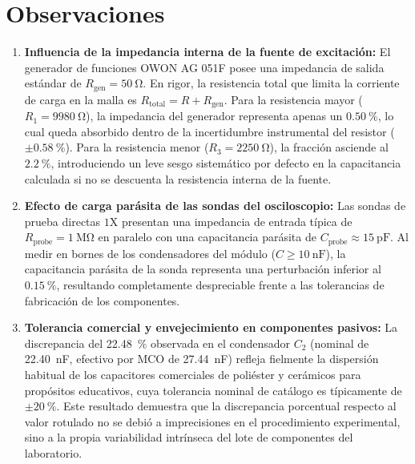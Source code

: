 
\section{Observaciones}
\label{sec:observaciones}

\begin{enumerate}
    \item \textbf{Influencia de la impedancia interna de la fuente de excitación:} El generador de funciones OWON AG 051F posee una impedancia de salida estándar de $R_{\text{gen}} = \qty{50}{\ohm}$. En rigor, la resistencia total que limita la corriente de carga en la malla es $R_{\text{total}} = R + R_{\text{gen}}$. Para la resistencia mayor ($R_1 = \qty{9980}{\ohm}$), la impedancia del generador representa apenas un $\qty{0,50}{\percent}$, lo cual queda absorbido dentro de la incertidumbre instrumental del resistor ($\pm\qty{0,58}{\percent}$). Para la resistencia menor ($R_3 = \qty{2250}{\ohm}$), la fracción asciende al $\qty{2,2}{\percent}$, introduciendo un leve sesgo sistemático por defecto en la capacitancia calculada si no se descuenta la resistencia interna de la fuente.
    
    \item \textbf{Efecto de carga parásita de las sondas del osciloscopio:} Las sondas de prueba directas $1\text{X}$ presentan una impedancia de entrada típica de $R_{\text{probe}} = \qty{1}{\mega\ohm}$ en paralelo con una capacitancia parásita de $C_{\text{probe}} \approx \qty{15}{\pico\farad}$. Al medir en bornes de los condensadores del módulo ($C \ge \qty{10}{\nano\farad}$), la capacitancia parásita de la sonda representa una perturbación inferior al $\qty{0,15}{\percent}$, resultando completamente despreciable frente a las tolerancias de fabricación de los componentes.
    
    \item \textbf{Tolerancia comercial y envejecimiento en componentes pasivos:} La discrepancia del \qty{+22,48}{\percent} observada en el condensador $C_2$ (nominal de \qty{22,40}{\nano\farad}, efectivo por MCO de \qty{27,44}{\nano\farad}) refleja fielmente la dispersión habitual de los capacitores comerciales de poliéster y cerámicos para propósitos educativos, cuya tolerancia nominal de catálogo es típicamente de $\pm\qty{20}{\percent}$. Este resultado demuestra que la discrepancia porcentual respecto al valor rotulado no se debió a imprecisiones en el procedimiento experimental, sino a la propia variabilidad intrínseca del lote de componentes del laboratorio.
    

\end{enumerate}
